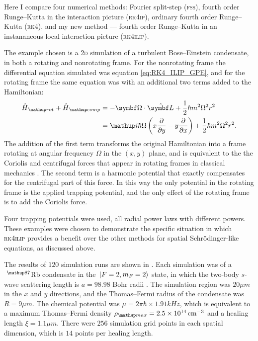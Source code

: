  Here I compare four numerical methods: Fourier split-step (\textsc{fss}), fourth order Runge--Kutta in the interaction picture (\textsc{rk4ip}), ordinary fourth order Runge--Kutta (\textsc{rk4}), and my new method --- fourth order Runge--Kutta in an instananeous local interaction picture (\textsc{rk4ilip}).

 The example chosen is a \textsc{2d} simulation of a turbulent Bose--Einstein condensate, in both a rotating and nonrotating frame. For the nonrotating frame the differential equation simulated was equation \eqref{eq:RK4_ILIP_GPE}, and for the rotating frame the same equation was with an additional two terms added to the Hamiltonian:
\begin{align}
\hat H_\up{rot} + \hat H_\up {comp} &= -\vec \Omega \cdot \hat{\vec L} +\frac12\hbar m^2\Omega^2 r^2\\
                &= \ii\hbar\Omega \left(x\pdv{y} - y\pdv{x}\right) +\frac12\hbar m^2\Omega^2 r^2.
\end{align}
The addition of the first term transforms the original Hamiltonian into a frame rotating at angular frequency $\Omega$ in the $(x, y)$ plane, and is equivalent to the the Coriolis and centrifugal forces that appear in rotating frames in classical mechanics \cite{Gulshani1978}. The second term is a harmonic potential that exactly compensates for the centrifugal part of this force. In this way the only potential in the rotating frame is the applied trapping potential, and the only effect of the rotating frame is to add the Coriolis force.

 Four trapping potentials were used, all radial power laws with different powers. These examples were chosen to demonstrate the specific situation in which \textsc{rk4ilip} provides a benefit over the other methods for spatial Schr\"odinger-like equations, as discussed above.

The results of $120$ simulation runs are shown in . Each simulation was of a $\ ^\up{87}$Rb condensate in the $\ket{F=2, m_F=2}$ state, in which the two-body $s$-wave scattering length is $a = 98.98$ Bohr radii \cite{vanKempen2002}. The simulation region was $20\unit{\mu m}$ in the $x$ and $y$ directions, and the Thomas--Fermi radius of the condensate was $R = 9\unit{\mu m}$.  The chemical potential was $\mu = 2\pi\hbar\times 1.91\unit{kHz}$, which is equivalent to a maximum Thomas--Fermi density $\rho_\up{max} = 2.5\E{14}\unit{cm}^{-3}$ and a healing length $\xi = 1.1\unit{\mu m}$. There were $256$ simulation grid points in each spatial dimension, which is $14$ points per healing length.

